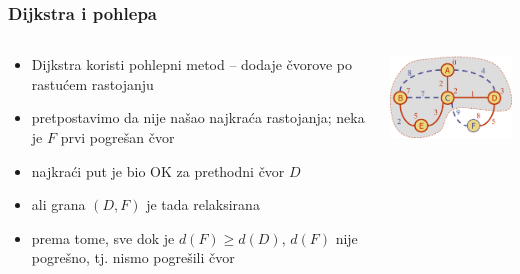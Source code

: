 \documentclass[compress,aspectratio=169]{beamer}
\begin{document}
\begin{frame}[fragile]
  \frametitle{Dijkstra i pohlepa}
  \begin{columns}
    \begin{column}[t]{11cm}
      \begin{itemize}
        \item Dijkstra koristi pohlepni metod -- dodaje čvorove po 
          rastućem rastojanju
        \item pretpostavimo da nije našao najkraća rastojanja; neka je 
          $F$ prvi pogrešan čvor
        \item najkraći put je bio OK za prethodni čvor $D$
        \item ali grana $(D,F)$ je tada relaksirana
        \item prema tome, sve dok je $d(F)\geq d(D)$, $d(F)$ nije
          pogrešno, tj. nismo pogrešili čvor
      \end{itemize}
    \end{column}
    \begin{column}[t]{5cm}
      \begin{center}
        \includegraphics[width=5cm]{asp-14-pic64.png}
      \end{center}
    \end{column}
  \end{columns}
\end{frame}
\end{document}
